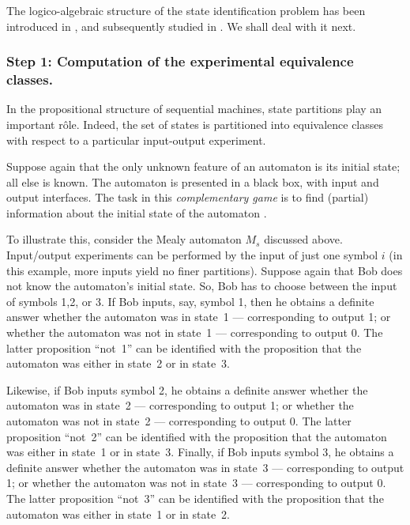\documentclass [11pt]{llncs}
\begin{document}
The logico-algebraic structure of the state identification problem
has been introduced in
\cite{svozil-93}, and subsequently studied in
\cite{svozil-93,schaller-92,schaller-95,schaller-96,dvur-pul-svo,svo:za,svozil-tkadlec,cal-sv-yu}.
We shall deal with it next.



\subsubsection*{Step 1:
Computation of the experimental equivalence classes.}
In the propositional structure of sequential machines, state partitions
play an important r\^{o}le. Indeed, the set of states is partitioned
into equivalence classes with respect to a particular input-output
experiment.

Suppose again that the only unknown feature of an automaton is its
initial
state; all else is known. The automaton is presented in a black box,
with input and output interfaces. The task in this {\em complementary
game} is to find (partial) information about the initial state of the
automaton \cite{e-f-moore}.

To illustrate this, consider the Mealy automaton $M_s$ discussed above.
Input/output experiments can be performed by the input of just one
symbol $i$
(in this example, more inputs yield no finer partitions).
Suppose again that
Bob does not know the automaton's initial state. So, Bob has to
choose between the input of symbols
1,2, or 3.
If Bob inputs, say, symbol 1,
then he obtains a definite answer whether the automaton was
in state~1 --- corresponding to
output 1; or whether the automaton was not in state~1 --- corresponding
to
output 0. The latter proposition ``not~1'' can be identified with the
proposition that the automaton was either in state~2 or in state~3.

Likewise, if Bob inputs symbol 2,
he obtains a definite answer whether the automaton was
in state~2 --- corresponding to
output 1; or whether the automaton was not in state~2 --- corresponding
to
output 0. The latter proposition ``not~2'' can be identified with the
proposition that the automaton was either in state~1 or in state~3.
Finally, if Bob inputs symbol 3,
he obtains a definite answer whether the automaton was
in state~3 --- corresponding to
output 1; or whether the automaton was not in state~3 --- corresponding
to
output 0. The latter proposition ``not~3'' can be identified with the
proposition that the automaton was either in state~1 or in state~2.
\end{document}
